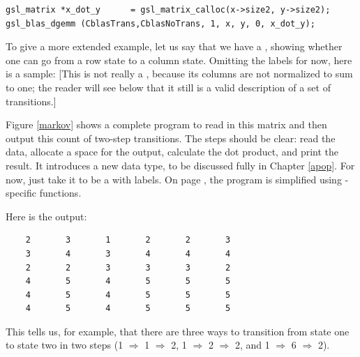 \begin{lstlisting}
gsl_matrix *x_dot_y      = gsl_matrix_calloc(x->size2, y->size2);
gsl_blas_dgemm (CblasTrans,CblasNoTrans, 1, x, y, 0, x_dot_y);
\end{lstlisting}

To give a more extended example, let us say that we have a , showing whether one can go from a row state to a
column state. Omitting the labels for now, here is a sample:
\label{twostep} 
[This is not really a , because its
columns are not normalized to sum to one; the reader will see below that it
still is a valid description of a set of transitions.]

Figure \ref{markov} shows a complete program to read in this matrix and then output this
count of two-step transitions. The steps should be clear: read the data,
allocate a space for the output, calculate the dot product, and print
the result. It introduces a new data type,  to be
discussed fully in Chapter \ref{apop}. For now, just take it to be a
 with labels. On page \pageref{markovtwo}, the
program is simplified using -specific functions.

Here is the output:
\begin{lstlisting}
    2       3       1       2       2       3
    3       4       3       4       4       4
    2       2       3       3       3       2
    4       5       4       5       5       5
    4       5       4       5       5       5
    4       5       4       5       5       5
\end{lstlisting}
This tells us, for example, that there are three ways to transition from state one to
state two in two steps (1 $\Rightarrow$ 1 $\Rightarrow$ 2, 
1 $\Rightarrow$ 2 $\Rightarrow$ 2,  and 1 $\Rightarrow$ 6 $\Rightarrow$
2).



